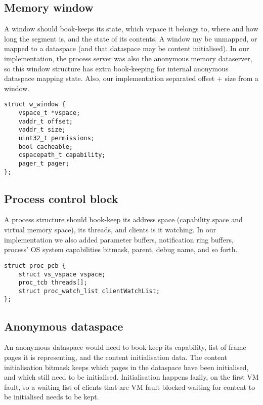 \subsection {Memory window}

A window should book-keeps its state, which vspace it belongs to, where and how long the segment is,
and the state of its contents. A window my be unmapped, or mapped to a dataspace (and that dataspace
may be content initialised). In our implementation, the process server was also the anonymous
memory dataserver, so this window structure has extra book-keeping for internal anonymous dataspace
mapping state. Also, our implementation separated offset + size from a window.

\begin{verbatim}
struct w_window {
    vspace_t *vspace;
    vaddr_t offset;
    vaddr_t size;
    uint32_t permissions;
    bool cacheable;
    cspacepath_t capability;
    pager_t pager;
};
\end{verbatim}

\subsection {Process control block}

A process structure should book-keep its address space (capability space and virtual memory space),
its threads, and clients is it watching. In our implementation we also added parameter buffers,
notification ring buffers, process' OS system capabilities bitmask, parent, debug name, and so
forth.

\begin{verbatim}
struct proc_pcb {
    struct vs_vspace vspace;
    proc_tcb threads[];
    struct proc_watch_list clientWatchList;
};
\end{verbatim}

\subsection {Anonymous dataspace}

An anonymous dataspace would need to book keep its capability, list of frame pages it is
representing, and the content initialisation data. The content initialisation bitmask keeps which
pages in the dataspace have been initialised, and which still need to be initialised. Initialisation
happens lazily, on the first VM fault, so a waiting list of clients that are VM fault blocked
waiting for content to be initialised needs to be kept.

